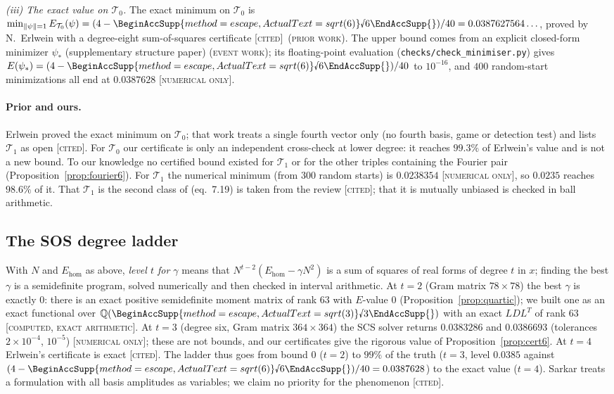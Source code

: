 \documentclass[11pt]{article}
\newcommand{\rnum}[1]{\BeginAccSupp{method=escape,ActualText=sqrt(#1)}\text{\textsurd}#1\EndAccSupp{}}
\newcommand{\rsix}{\rnum{6}}
\newcommand{\norm}[1]{\lVert #1\rVert}
\newcommand{\Tz}{\mathcal{T}_0}          %
\newcommand{\To}{\mathcal{T}_1}          %
\newcommand{\E}{E}                       %
\newcommand{\st}[1]{\textsc{[#1]}}
\newcommand{\stexact}{\st{computed, exact arithmetic}}
\newcommand{\stnum}{\st{numerical only}}
\newcommand{\stcited}{\st{cited}}
\newcommand{\event}{\textsc{(event work)}}
\newcommand{\prior}{\textsc{(prior work)}}
\theoremstyle{definition}
\theoremstyle{remark}
\begin{document}
\emph{(iii) The exact value on $\Tz$.} The exact minimum on $\Tz$ is
$\min_{\norm\psi=1}\E_{\Tz}(\psi)=(4-\rsix)/40=0.0387627564\ldots$,
proved by N.~Erlwein with a degree-eight sum-of-squares certificate \cite{Erlwein} \stcited\ \prior. The upper
bound comes from an explicit closed-form minimizer $\psi_\ast$ (supplementary structure paper) \event; its
floating-point evaluation (\texttt{checks/check\_minimiser.py}) gives $\E(\psi_\ast)=(4-\rsix)/40$ to $10^{-16}$, and $400$ random-start minimizations all end at
$0.0387628$ \stnum.

\paragraph{Prior and ours.} Erlwein \cite{Erlwein} proved the exact minimum on $\Tz$; that work treats a single fourth
vector only (no fourth basis, game or detection test) and lists $\To$ as open \stcited. For $\Tz$ our certificate is only
an independent cross-check at lower degree: it reaches $99.3\%$ of Erlwein's value and is not a new bound. To our
knowledge no certified bound existed for $\To$ or for the other triples containing the Fourier pair
(Proposition~\ref{prop:fourier6}). For $\To$ the numerical minimum (from $300$ random
starts) is $0.0238354$ \stnum, so $0.0235$ reaches $98.6\%$ of it. That $\To$ is the second class of \cite{MWreview} (eq.~7.19) is taken from the review \stcited; that it is mutually
unbiased is checked in ball arithmetic.

\subsection{The SOS degree ladder}\label{sec:ladder}

With $N$ and $\E_{\mathrm{hom}}$ as above, \emph{level $t$ for $\gamma$} means that
$N^{t-2}(\E_{\mathrm{hom}}-\gamma N^2)$ is a sum of squares of real forms of degree $t$ in $x$; finding the best
$\gamma$ is a semidefinite program, solved numerically and then checked in interval arithmetic. At $t=2$ (Gram
matrix $78\times78$) the best $\gamma$ is exactly $0$: there is an exact positive semidefinite moment
matrix of rank $63$ with $\E$-value $0$ (Proposition~\ref{prop:quartic}); we built one as an
exact functional over $\mathbb Q(\rnum{3})$ with an exact $LDL^T$ of rank $63$ \stexact. At $t=3$ (degree six, Gram matrix
$364\times364$) the SCS solver returns $0.0383286$ and $0.0386693$ (tolerances $2\times10^{-4}$, $10^{-5}$) \stnum;
these are not bounds, and our certificates give the rigorous value of Proposition~\ref{prop:cert6}. At $t=4$ Erlwein's
certificate is exact \cite{Erlwein} \stcited. The ladder thus goes from bound $0$ ($t=2$) to $99\%$ of the truth
($t=3$, level $0.0385$ against $(4-\rsix)/40=0.0387628$) to the exact value ($t=4$). Sarkar \cite{Sarkar26} treats a
formulation with all basis amplitudes as variables; we claim no priority for the phenomenon \stcited.
\end{document}
